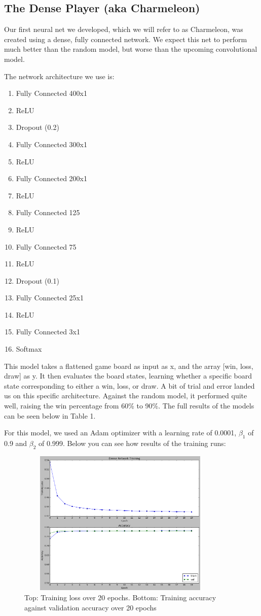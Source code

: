 
\subsection{The Dense Player (aka Charmeleon)}

Our first neural net we developed, which we will refer to as Charmeleon, was created using a dense, fully connected network. We expect this net to perform much better than the random model, but worse than the upcoming convolutional model.

The network architecture we use is:
\begin{enumerate}
	\item Fully Connected 400x1
	\item ReLU
	\item Dropout (0.2)
	\item Fully Connected 300x1
	\item ReLU
	\item Fully Connected 200x1
	\item ReLU
	\item Fully Connected 125
	\item ReLU
	\item Fully Connected 75
	\item ReLU
	\item Dropout (0.1)
	\item Fully Connected 25x1
	\item ReLU
	\item Fully Connected 3x1
	\item Softmax
\end{enumerate}
This model takes a flattened game board as input as x, and the array [win, loss, draw] as y. It then evaluates the board states, learning whether a specific board state corresponding to either a win, loss, or draw. A bit of trial and error landed us on this specific architecture. Against the random model, it performed quite well, raising the win percentage from 60\% to 90\%. The full results of the models can be seen below in Table 1. 

For this model, we used an Adam optimizer with a learning rate of 0.0001, $\beta_1$ of 0.9 and $\beta_2$ of 0.999. Below you can see how results of the training runs:

\begin{figure}[h!]
	\centering
	\includegraphics[width=10cm, height=7cm]{dense-net-training.png}
	\caption{Top: Training loss over 20 epochs. Bottom: Training accuracy against validation accuracy over 20 epochs}
	\label{fig:conv_net}
\end{figure}
